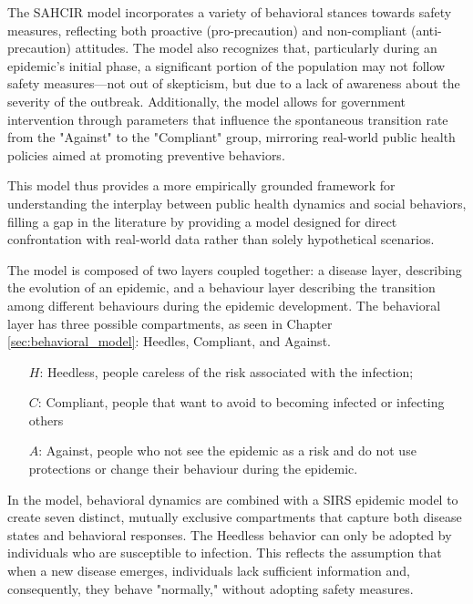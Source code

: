 The SAHCIR  model incorporates a variety of behavioral stances towards safety measures, reflecting both proactive (pro-precaution) and non-compliant (anti-precaution) attitudes. The model also recognizes that, particularly during an epidemic's initial phase, a significant portion of the population may not follow safety measures—not out of skepticism, but due to a lack of awareness about the severity of the outbreak. Additionally, the model allows for government intervention through parameters that influence the spontaneous transition rate from the "Against" to the "Compliant" group, mirroring real-world public health policies aimed at promoting preventive behaviors. 

This model thus provides a more empirically grounded framework for understanding the interplay between public health dynamics and social behaviors, filling a gap in the literature by providing a model designed for direct confrontation with real-world data rather than solely hypothetical scenarios.


The model is composed of two layers coupled together: a disease layer, describing the evolution of an epidemic, and a behaviour layer describing the transition among different behaviours during the epidemic development.
The behavioral layer has three possible compartments, as seen in Chapter \ref{sec:behavioral_model}: Heedles, Compliant, and Against.

\begin{itemize}
	\item[$H$:] Heedless, people careless of the risk associated with the infection;
	\item[$C$:] Compliant, people that want to avoid to becoming infected or infecting others
	\item[$A$:] Against, people who not see the epidemic as a risk and do not use protections or change their behaviour during the epidemic. 
\end{itemize}

In the model, behavioral dynamics are combined with a SIRS epidemic model to create seven distinct, mutually exclusive compartments that capture both disease states and behavioral responses. The Heedless behavior can only be adopted by individuals who are susceptible to infection. This reflects the assumption that when a new disease emerges, individuals lack sufficient information and, consequently, they behave "normally," without adopting safety measures.

